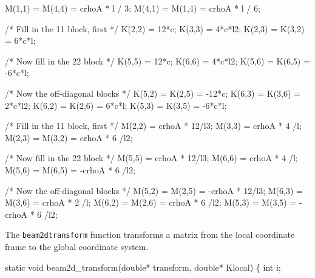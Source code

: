 \nwendcode{}\nwdocspar

\nwenddocs{}\endmoddef
M(1,1) = M(4,4) =  crhoA * l / 3;
M(4,1) = M(1,4) =  crhoA * l / 6;

\nwendcode{}\nwdocspar

\nwenddocs{}\endmoddef
/* Fill in the 11 block, first */
K(2,2) =           12*c;
K(3,3) =            4*c*l2;
K(2,3) = K(3,2) =   6*c*l;

/* Now fill in the 22 block */
K(5,5) =           12*c;
K(6,6) =            4*c*l2;
K(5,6) = K(6,5) =  -6*c*l;

/* Now the off-diagonal blocks */
K(5,2) = K(2,5) = -12*c;
K(6,3) = K(3,6) =   2*c*l2;
K(6,2) = K(2,6) =   6*c*l;
K(5,3) = K(3,5) =  -6*c*l;

\nwendcode{}\nwdocspar

\nwenddocs{}\endmoddef
/* Fill in the 11 block, first */
M(2,2) =           crhoA * 12/l3;
M(3,3) =           crhoA * 4 /l;
M(2,3) = M(3,2) =  crhoA * 6 /l2;

/* Now fill in the 22 block */
M(5,5) =           crhoA * 12/l3;
M(6,6) =           crhoA * 4 /l;
M(5,6) = M(6,5) = -crhoA * 6 /l2;

/* Now the off-diagonal blocks */
M(5,2) = M(2,5) = -crhoA * 12/l3;
M(6,3) = M(3,6) =  crhoA * 2 /l;
M(6,2) = M(2,6) =  crhoA * 6 /l2;
M(5,3) = M(3,5) = -crhoA * 6 /l2;

\nwendcode{}\nwdocspar

The {\tt{}beam2d{}transform} function transforms a matrix from
the local coordinate frame to the global coordinate system.

\nwenddocs{}\plusendmoddef
static void beam2d_transform(double* transform, double* Klocal)
\{
    int i;


